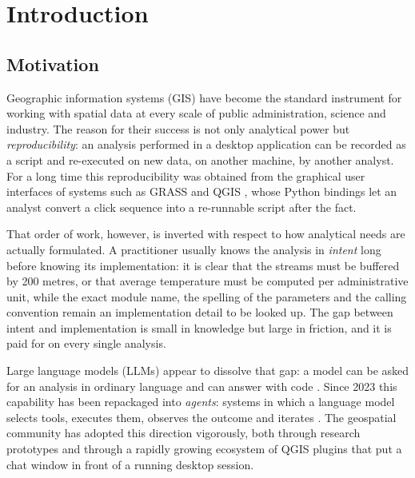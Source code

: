 \captionsetup{font=small,labelfont=bf}



\tableofcontents

\chapter{Introduction}
\label{ch:introduction}

\section{Motivation}

Geographic information systems (GIS) have become the standard instrument for
working with spatial data at every scale of public administration, science and
industry. The reason for their success is not only analytical power but
\emph{reproducibility}: an analysis performed in a desktop application can be
recorded as a script and re-executed on new data, on another machine, by
another analyst. For a long time this reproducibility was obtained from the
graphical user interfaces of systems such as GRASS \cite{neteler2012grass} and
QGIS \cite{qgissoftware}, whose Python bindings \cite{pyqgis,grass_tools} let
an analyst convert a click sequence into a re-runnable script after the fact.

That order of work, however, is inverted with respect to how analytical needs
are actually formulated. A practitioner usually knows the analysis in
\emph{intent} long before knowing its implementation: it is clear that the
streams must be buffered by 200 metres, or that average temperature must be
computed per administrative unit, while the exact module name, the spelling of
the parameters and the calling convention remain an implementation detail to be
looked up. The gap between intent and implementation is small in knowledge but
large in friction, and it is paid for on every single analysis.

Large language models (LLMs) appear to dissolve that gap: a model can be asked
for an analysis in ordinary language and can answer with code
\cite{vaswani2017attention,chen2021codex}. Since 2023 this capability has been
repackaged into \emph{agents}: systems in which a language model selects tools,
executes them, observes the outcome and iterates \cite{yao2023react}. The
geospatial community has adopted this direction vigorously, both through
research prototypes \cite{zhang2023geogpt,zhang2024geollmtooluse,singh2024geollmengine}
and through a rapidly growing ecosystem of QGIS plugins that put a chat window
in front of a running desktop session.

